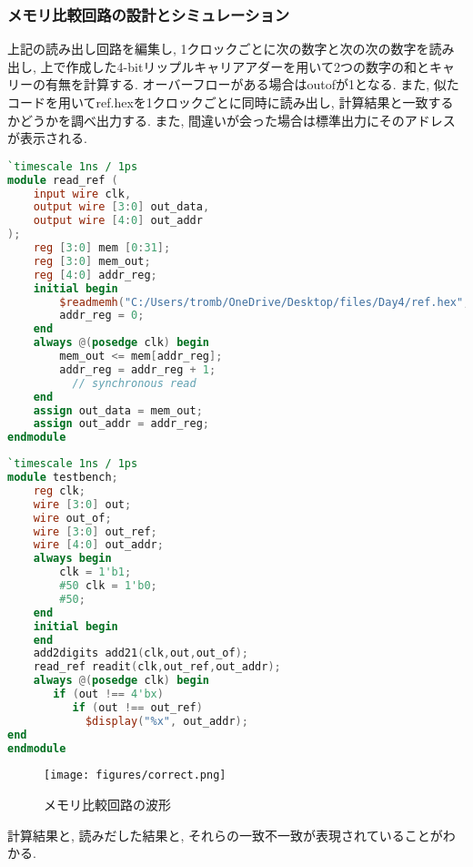 \documentclass[titlepage]{ltjsarticle}
\begin{document}
\subsubsection{メモリ比較回路の設計とシミュレーション}
上記の読み出し回路を編集し, 1クロックごとに次の数字と次の次の数字を読み出し, 上で作成した4-bitリップルキャリアアダーを用いて2つの数字の和とキャリーの有無を計算する. オーバーフローがある場合はoutofが1となる. また, 似たコードを用いてref.hexを1クロックごとに同時に読み出し, 計算結果と一致するかどうかを調べ出力する. また, 間違いが会った場合は標準出力にそのアドレスが表示される. 
\begin{lstlisting}[caption=ref.hex読み出し回路デザイン,language=verilog]
`timescale 1ns / 1ps
module read_ref ( 
    input wire clk,
    output wire [3:0] out_data,
    output wire [4:0] out_addr
);
    reg [3:0] mem [0:31];
    reg [3:0] mem_out;
    reg [4:0] addr_reg;
    initial begin
        $readmemh("C:/Users/tromb/OneDrive/Desktop/files/Day4/ref.hex", mem);
        addr_reg = 0;
    end
    always @(posedge clk) begin
        mem_out <= mem[addr_reg];
        addr_reg = addr_reg + 1;
          // synchronous read
    end
    assign out_data = mem_out;
    assign out_addr = addr_reg;
endmodule
\end{lstlisting}
\begin{lstlisting}[caption=メモリ比較回路テストベンチ,language=verilog]
`timescale 1ns / 1ps
module testbench;
	reg clk;
	wire [3:0] out;
	wire out_of;
	wire [3:0] out_ref;
	wire [4:0] out_addr;
	always begin
		clk = 1'b1;
		#50 clk = 1'b0;
		#50;
	end
	initial begin  
	end
	add2digits add21(clk,out,out_of);
	read_ref readit(clk,out_ref,out_addr);
	always @(posedge clk) begin
	   if (out !== 4'bx)
	   	  if (out !== out_ref)
	        $display("%x", out_addr);
end
endmodule
\end{lstlisting}
\begin{figure}[H]
    \begin{center}
        \texttt{[image: figures/correct.png]}
        \caption{メモリ比較回路の波形}
    \end{center}
\end{figure}
計算結果と, 読みだした結果と, それらの一致不一致が表現されていることがわかる. 
\end{document}
